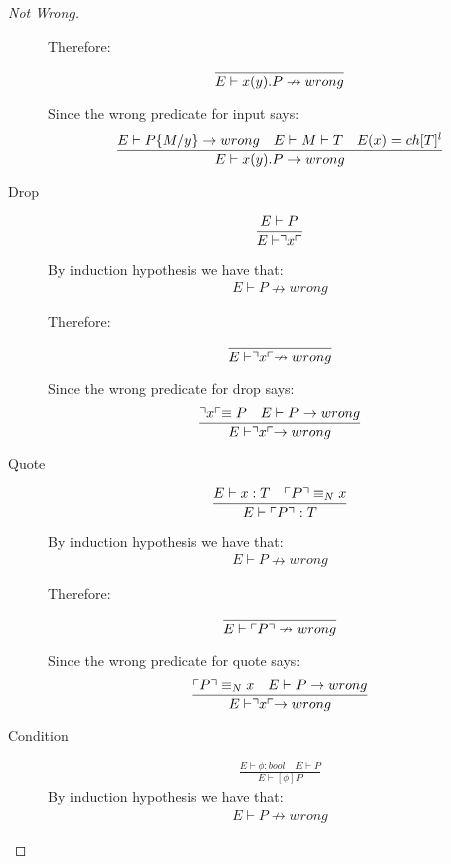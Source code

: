 \begin{proof}[Not Wrong]
\begin{description}
		Therefore:
		\begin{align*}
		\frac{}{E \vdash x(y).P \nrightarrow wrong}
		\end{align*}
		
		Since the wrong predicate for input says:
		\begin{align*}
		\frac{E \vdash P\{M/y\}\rightarrow wrong \quad E\vdash M\vdash T \quad E(x)=ch[T]^l}{E \vdash x(y).P \rightarrow wrong}
		\end{align*}
	\item[Drop]
		\begin{align*}
		\frac{E \vdash P}{E \vdash \urcorner x \ulcorner}
		\end{align*}
		
		By induction hypothesis we have that:
		\begin{align*}
		E \vdash P \nrightarrow wrong
		\end{align*}
		
		Therefore:
		\begin{align*}
		\frac{}{E \vdash \urcorner x \ulcorner \nrightarrow wrong}
		\end{align*}
		
		Since the wrong predicate for drop says:
		\begin{align*}
		\frac{\urcorner x \ulcorner \equiv P \quad E \vdash P \rightarrow wrong}{E \vdash \urcorner x \ulcorner \rightarrow wrong}
		\end{align*}
	\item[Quote]
		\begin{align*}
		\frac{E \vdash x:T \quad \ulcorner P \urcorner \equiv _N x}{E \vdash \ulcorner P \urcorner:T}
		\end{align*}
		
		By induction hypothesis we have that:
		\begin{align*}
		E \vdash P \nrightarrow wrong
		\end{align*}
		
		Therefore:
		\begin{align*}
		\frac{}{E \vdash \ulcorner P \urcorner \nrightarrow wrong}
		\end{align*}
		
		Since the wrong predicate for quote says:
		\begin{align*}
		\frac{\ulcorner P \urcorner \equiv _N x \quad E \vdash P \rightarrow wrong}{E \vdash \urcorner x \ulcorner \rightarrow wrong}
		\end{align*}
	\item[Condition]
		\begin{align*}
		\frac{E \vdash \phi : bool \quad E \vdash P}{E \vdash [\phi]P}
		\end{align*}
		By induction hypothesis we have that:
		\begin{align*}
		E \vdash P \nrightarrow wrong
		\end{align*}
		

\end{description}
\end{proof}
